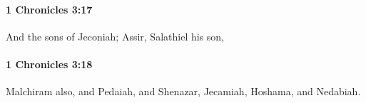 		\paragraph{1 Chronicles 3:17} %
			\label{1CHRONICLES-3-17}

			And the sons of Jeconiah; Assir, Salathiel his son,


		\paragraph{1 Chronicles 3:18} %
			\label{1CHRONICLES-3-18}

			Malchiram also, and Pedaiah, and Shenazar, Jecamiah, Hoshama, and Nedabiah.


